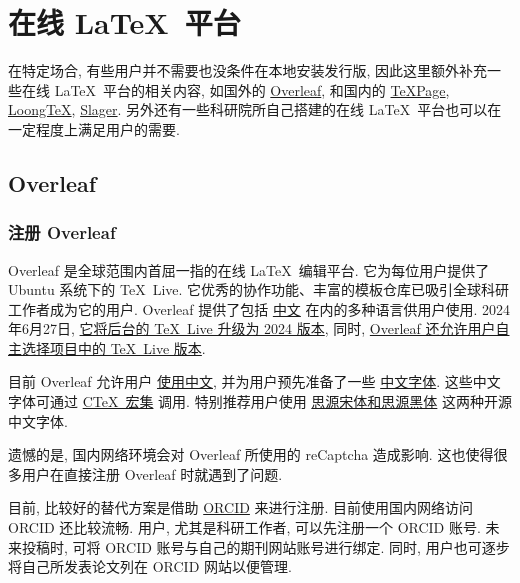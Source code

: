 
\chapter{在线 \LaTeX\ 平台}

在特定场合,
有些用户并不需要也没条件在本地安装发行版,
因此这里额外补充一些在线 \LaTeX\ 平台的相关内容,
如国外的 \href{https://www.overleaf.com/}{Overleaf},
和国内的 \href{https://www.texpage.com/}{TeXPage},
\href{https://www.loongtex.com/}{LoongTeX},
\href{https://www.slager.link/#/Home}{Slager}.
另外还有一些科研院所自己搭建的在线 \LaTeX\ 平台也可以在一定程度上满足用户的需要.

\section{Overleaf}

\subsection{注册 Overleaf}

Overleaf 是全球范围内首屈一指的在线 \LaTeX\ 编辑平台.
它为每位用户提供了 Ubuntu 系统下的 \TeX~Live.
它优秀的协作功能、丰富的模板仓库已吸引全球科研工作者成为它的用户.
Overleaf 提供了包括%
\href{https://cn.overleaf.com/}{中文}%
在内的多种语言供用户使用.
2024年6月27日,
\href{https://www.overleaf.com/blog/tex-live-2024-is-now-available}{它将后台的 \TeX~Live 升级为 2024 版本},
同时,
\href{https://www.overleaf.com/blog/new-feature-select-your-tex-live-compiler-version}{Overleaf 还允许用户自主选择项目中的 \TeX~Live 版本}.

目前 Overleaf 允许用户%
\href{https://www.overleaf.com/learn/latex/Chinese}{使用中文},
并为用户预先准备了一些%
\href{https://www.overleaf.com/learn/latex/Questions/Which_OTF_or_TTF_fonts_are_supported_via_fontspec%3F#Fonts_for_CJK}{中文字体}.
这些中文字体可通过%
\href{https://www.overleaf.com/latex/templates/using-the-ctex-package-on-overleaf-zai-overleafping-tai-shang-shi-yong-ctex/gndvpvsmjcqx}{C\TeX\ 宏集}%
调用.
特别推荐用户使用%
\href{https://www.overleaf.com/latex/examples/demonstration-of-noto-serif-cjk-and-noto-sans-cjk-fonts/sgrwgcddtqsq}{思源宋体和思源黑体}%
这两种开源中文字体.

遗憾的是,
国内网络环境会对 Overleaf 所使用的 reCaptcha 造成影响.
这也使得很多用户在直接注册 Overleaf 时就遇到了问题.

目前,
比较好的替代方案是借助 \href{https://orcid.org/}{ORCID} 来进行注册.
目前使用国内网络访问 ORCID 还比较流畅.
用户, 尤其是科研工作者, 可以先注册一个 ORCID 账号.
未来投稿时,
可将 ORCID 账号与自己的期刊网站账号进行绑定.
同时,
用户也可逐步将自己所发表论文列在 ORCID 网站以便管理.

